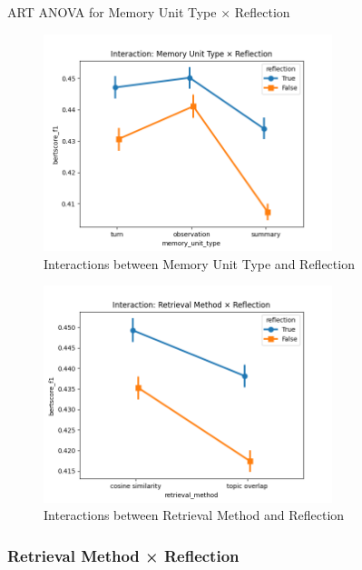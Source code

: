 \begin{table}[htbp]
\centering
\tiny

\caption{ART ANOVA for Memory Unit Type × Reflection}
\label{tab:memory_unit_type_x_reflection_table}
\end{table}


\begin{figure}[p]
\centering
\includegraphics[width=0.75\textwidth]{charts/interaction_memory_unit_type_x_reflection.png}
\caption{Interactions between Memory Unit Type and Reflection}
\label{fig:interaction_memory_unit_type_x_reflection}
\end{figure}

\begin{figure}[p]
\centering
\includegraphics[width=0.75\textwidth]{charts/interaction_retrieval_method_x_reflection.png}
\caption{Interactions between Retrieval Method and Reflection}
\label{fig:interaction_retrieval_method_x_reflection}
\end{figure}


\subsubsection{Retrieval Method × Reflection}


